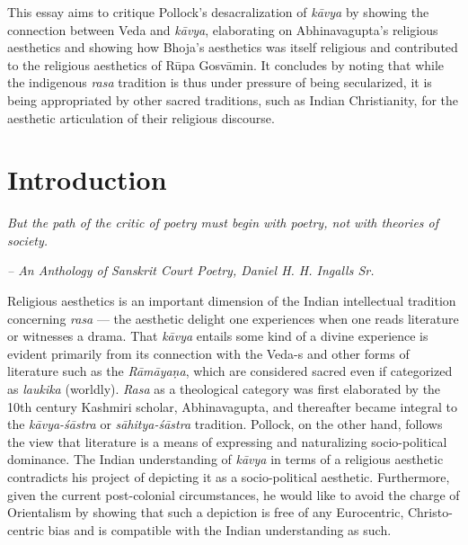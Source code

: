 This essay aims to critique Pollock's desacralization of \textsl{kāvya} by showing the connection between Veda and \textsl{kāvya}, elaborating on Abhinavagupta's religious aesthetics and showing how Bhoja's aesthetics was itself religious and contributed to the religious aesthetics of Rūpa Gosvāmin. It concludes by noting that while the indigenous \textsl{rasa} tradition is thus under pressure of being secularized, it is being appropriated by other sacred traditions, such as Indian Christianity, for the aesthetic articulation of their religious discourse.\\[-21pt]

\section*{Introduction}

\textsl{But the path of the critic of poetry must begin with poetry, not with theories of society.}

\hfill \textsl{-- An Anthology of Sanskrit Court Poetry, Daniel H. H. Ingalls Sr.}

\smallskip

Religious aesthetics is an important dimension of the Indian intellectual tradition concerning \textsl{rasa} --- the aesthetic delight one experiences when one reads literature or witnesses a drama. That \textsl{kāvya} entails some kind of a divine experience is evident primarily from its connection with the Veda-s and other forms of literature such as the \textsl{Rāmāyaṇa}, which are considered sacred even if categorized as \textsl{laukika} (worldly). \textsl{Rasa} as a theological category was first elaborated by the 10th century Kashmiri scholar, Abhinavagupta, and thereafter became integral to the \textsl{kāvya-śāstra} or \textsl{sāhitya-śāstra} tradition. Pollock, on the other hand, follows the view that literature is a means of expressing and naturalizing socio-political dominance. The Indian understanding of \textsl{kāvya} in terms of a religious aesthetic contradicts his project of depicting it as a socio-political aesthetic. Furthermore, given the current post-colonial circumstances, he would like to avoid the charge of Orientalism by showing that such a depiction is free of any Eurocentric, Christo-centric bias and is compatible with the Indian understanding as such.

